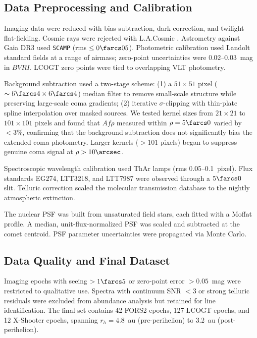 \documentclass[preprint2]{aastex631}
\begin{document}
\subsection{Data Preprocessing and Calibration}

Imaging data were reduced with bias subtraction, dark correction, and twilight flat-fielding. Cosmic rays were rejected with L.A.Cosmic \citep{vandokkum01}. Astrometry against Gaia DR3 used \texttt{SCAMP} \citep{bertin06} (rms $\leq 0\farcs05$). Photometric calibration used Landolt standard fields at a range of airmass; zero-point uncertainties were 0.02--0.03~mag in $BVRI$. LCOGT zero points were tied to overlapping VLT photometry.

Background subtraction used a two-stage scheme: (1) a $51 \times 51$ pixel ($\sim 6\farcs4 \times 6\farcs4$) median filter to remove small-scale structure while preserving large-scale coma gradients; (2) iterative $\sigma$-clipping with thin-plate spline interpolation over masked sources. We tested kernel sizes from $21 \times 21$ to $101 \times 101$ pixels and found that $Af\rho$ measured within $\rho = 5\farcs0$ varied by $< 3\%$, confirming that the background subtraction does not significantly bias the extended coma photometry. Larger kernels ($> 101$ pixels) began to suppress genuine coma signal at $\rho > 10\arcsec$.

Spectroscopic wavelength calibration used ThAr lamps (rms 0.05--0.1~pixel). Flux standards EG274, LTT3218, and LTT7987 were observed through a $5\farcs0$ slit. Telluric correction scaled the molecular transmission database \citep{moehler14} to the nightly atmospheric extinction.

The nuclear PSF was built from unsaturated field stars, each fitted with a Moffat profile. A median, unit-flux-normalized PSF was scaled and subtracted at the comet centroid. PSF parameter uncertainties were propagated via Monte Carlo.

\subsection{Data Quality and Final Dataset}

Imaging epochs with seeing $>1\farcs5$ or zero-point error $>0.05$~mag were restricted to qualitative use. Spectra with continuum SNR $<3$ or strong telluric residuals were excluded from abundance analysis but retained for line identification. The final set contains 42 FORS2 epochs, 127 LCOGT epochs, and 12 X-Shooter epochs, spanning $r_h = 4.8$~au (pre-perihelion) to 3.2~au (post-perihelion).
\end{document}
